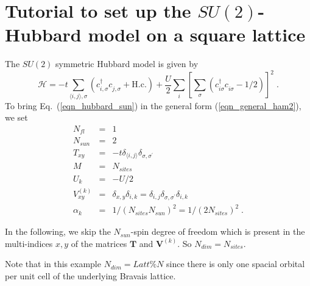 \section{Tutorial to set up the $SU(2)$-Hubbard model on a square lattice}
The $SU(2)$ symmetric Hubbard model is given by
\begin{equation}
\label{eqn_hubbard_sun}
\mathcal{H}=
-t\sum\limits_{\langle i,j\rangle,\sigma} 
\left(c^{\dagger}_{i,\sigma} c^{\phantom\dagger}_{j,\sigma} + \text{H.c.}
\right)
+ \frac{U}{2}\sum\limits_{i}\left[
\sum\limits_{\sigma}
\left(  c^{\dagger}_{i\sigma} c^{\phantom\dagger}_{i\sigma}  -1/2 \right) \right]^{2}\;.
\end{equation}
To bring Eq.~(\ref{eqn_hubbard_sun}) in the general form (\ref{eqn_general_ham2}), we set
\begin{eqnarray}
N_{fl}&=&1\nonumber\\
N_{sun}&=&2\nonumber\\
T_{x y}&=&-t\delta_{\langle i,j\rangle}\delta_{\sigma,\sigma^{\prime}}\nonumber\\
M&=&N_{sites}\nonumber\\
U_{k}&=&-U/2\nonumber\\
V_{x y}^{(k)}&=&
\delta_{x,y}\delta_{i,k}=
\delta_{i,j}\delta_{\sigma,\sigma^{\prime}}\delta_{i,k}\nonumber\\
\alpha_{k}&=&1/(N_{sites}N_{sun})^{2}=1/(2 N_{sites})^{2}\;.
\end{eqnarray}

In the following, we skip the $N_{sun}$-spin degree of freedom which is present in the multi-indices $x,y$ of the matrices $\bm{T}$ and ${\bm V}^{(k)}$. 
So $N_{dim}=N_{sites}$. 


Note that in this example $N_{dim}=Latt\%N$ since there is only one spacial orbital per unit cell of the underlying Bravais lattice.

